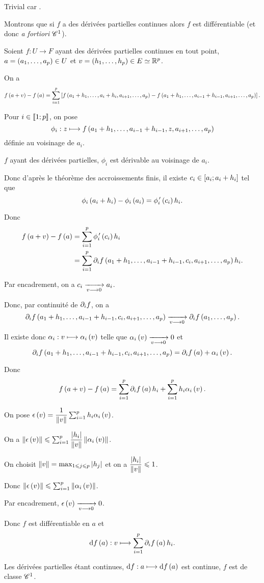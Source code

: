 \begin{dem}
\impdir Trivial car .

\imprec

Montrons que si \(f\) a des dérivées partielles continues alors \(f\) est différentiable (et donc \textit{a fortiori} \(\mathscr{C}^{1}\)).

Soient \(f:U\to F\) ayant des dérivées partielles continues en tout point, \(a=\left(a_1,\dots,a_p\right)\in U\) et \(v=\left(h_1,\dots,h_p\right)\in E\simeq\mathbb{R}^p\).

On a \[f\left(a+v\right)-f\left(a\right)=\sum_{i=1}^p\left[f\left(a_1+h_1,\dots,a_i+h_i,a_{i+1},\dots,a_p\right)-f\left(a_1+h_1,\dots,a_{i-1}+h_{i-1},a_{i+1},\dots,a_p\right)\right].\]

Pour \(i\in\left\llbracket1;p\right\rrbracket\), on pose \[\phi_i:z\longmapsto f\left(a_1+h_1,\dots,a_{i-1}+h_{i-1},z,a_{i+1},\dots,a_p\right)\] définie au voisinage de \(a_i\).

\(f\) ayant des dérivées partielles, \(\phi_i\) est dérivable au voisinage de \(a_i\).

Donc d'après le théorème des accroissements finis, il existe \(c_i\in\left[a_i;a_i+h_i\right]\) tel que \[\phi_i\left(a_i+h_i\right)-\phi_i\left(a_i\right)=\phi_i^{\,\prime}\left(c_i\right)h_i.\]

Donc \[\begin{aligned}
f\paren{a+v}-f\paren{a}&=\sum_{i=1}^p\phi_i\prim\paren{c_i}h_i \\
&=\sum_{i=1}^p\pdif{i}f\paren{a_1+h_1,\dots,a_{i-1}+h_{i-1},c_i,a_{i+1},\dots,a_p}h_i.
\end{aligned}\]

Par encadrement, on a \(c_i\xrightarrow[v\longrightarrow0]{}a_i\).

Donc, par continuité de \(\pdif{i}f\), on a \[\pdif{i}f\paren{a_1+h_1,\dots,a_{i-1}+h_{i-1},c_i,a_{i+1},\dots,a_p}\tendqd{v\to0}\pdif{i}f\paren{a_1,\dots,a_p}.\]

Il existe donc \(\alpha_i:v\longmapsto\alpha_i\left(v\right)\) telle que \(\alpha_i\left(v\right)\xrightarrow[v\longrightarrow0]{}0\) et \[\pdif{i}f\paren{a_1+h_1,\dots,a_{i-1}+h_{i-1},c_i,a_{i+1},\dots,a_p}=\pdif{i}f\paren{a}+\alpha_i\paren{v}.\]

Donc \[f\paren{a+v}-f\paren{a}=\sum_{i=1}^p\pdif{i}f\paren{a}h_i+\sum_{i=1}^ph_i\alpha_i\paren{v}.\]

On pose \(\epsilon\paren{v}=\dfrac{1}{\norme{v}}\sum_{i=1}^ph_i\alpha_i\paren{v}\).

On a \(\norme{\epsilon\paren{v}}\leq\sum_{i=1}^p\dfrac{\abs{h_i}}{\norme{v}}\norme{\alpha_i\paren{v}}\).

On choisit \(\norme{v}=\max_{1\leq j\leq p}\abs{h_j}\) et on a \(\dfrac{\abs{h_i}}{\norme{v}}\leq1\).

Donc \(\norme{\epsilon\paren{v}}\leq\sum_{i=1}^p\norme{\alpha_i\paren{v}}\).

Par encadrement, \(\epsilon\left(v\right)\xrightarrow[v\longrightarrow0]{}0\).

Donc \(f\) est différentiable en \(a\) et \[\odif{f}\paren{a}:v\mapsto\sum_{i=1}^p\pdif{i}f\paren{a}h_i.\]

Les dérivées partielles étant continues, \(\odif{f}:a\mapsto\odif{f}\paren{a}\) est continue, \ie \(f\) est de classe \(\mathscr{C}^{1}\).
\end{dem}

